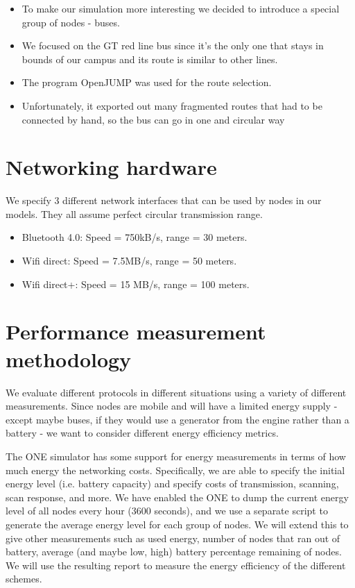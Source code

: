 \documentclass[conference]{IEEEtran}
\begin{document}
\begin{itemize}
  \item To make our simulation more interesting we decided to introduce a special group of nodes - buses.
  \item We focused on the GT red line bus since it’s the only one that stays in bounds of our campus and its route is similar to other lines.
  \item The program OpenJUMP was used for the route selection.
  \item Unfortunately, it exported out many fragmented routes that had to be connected by hand, so the bus can go in one and circular way
\end{itemize}

\section{Networking hardware}

We specify 3 different network interfaces that can be used by nodes in our models. They all assume perfect circular transmission range.

\begin{itemize}
  \item Bluetooth 4.0: Speed = 750kB/s, range = 30 meters.
  \item Wifi direct: Speed = 7.5MB/s, range = 50 meters.
  \item Wifi direct+: Speed = 15 MB/s, range = 100 meters.
\end{itemize}

\section{Performance measurement methodology}

We evaluate different protocols in different situations using a variety of different measurements. Since nodes are mobile and will have a limited energy supply - except maybe buses, if they would use a generator from the engine rather than a battery - we want to consider different energy efficiency metrics.

The ONE simulator has some support for energy measurements in terms of how much energy the networking costs. Specifically, we are able to specify the initial energy level (i.e. battery capacity) and specify costs of transmission, scanning, scan response, and more. We have enabled the ONE to dump the current energy level of all nodes every hour (3600 seconds), and we use a separate script to generate the average energy level for each group of nodes. We will extend this to give other measurements such as used energy, number of nodes that ran out of battery, average (and maybe low, high) battery percentage remaining of nodes. We will use the resulting report to measure the energy efficiency of the different schemes.
\end{document}
